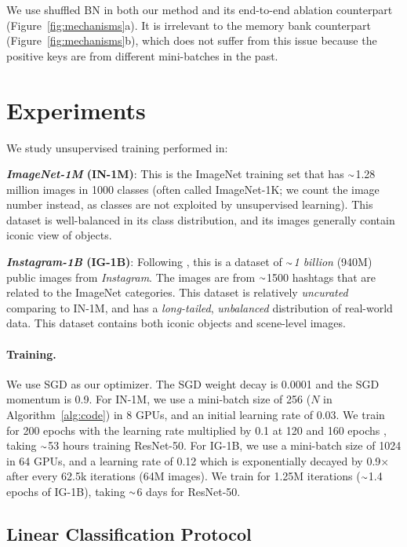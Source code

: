 \documentclass[10pt,twocolumn,letterpaper]{article}
\newcommand{\app}{\raise.17ex\hbox{$\scriptstyle\sim$}}
\begin{document}
We use shuffled BN in both our method and its end-to-end ablation counterpart (Figure~\ref{fig:mechanisms}a). It is irrelevant to the memory bank counterpart (Figure~\ref{fig:mechanisms}b), which does not suffer from this issue because the positive keys are from different mini-batches in the past.

\section{Experiments}
\label{sec:exp}

We study unsupervised training performed in:

\textbf{\emph{ImageNet-1M} (IN-1M)}: This is the ImageNet \cite{Deng2009} training set that has $\app$1.28 million images in 1000 classes (often called ImageNet-1K; we count the image number instead, as classes are not exploited by unsupervised learning).
This dataset is well-balanced in its class distribution, and its images generally contain iconic view of objects.

\textbf{\emph{Instagram-1B} (IG-1B)}: Following \cite{Mahajan2018}, this is a dataset of $\app$\emph{1 billion} (940M) public images from \mbox{\emph{Instagram}}. The images are from $\app$1500 hashtags \cite{Mahajan2018} that are related to the ImageNet categories. This dataset is relatively \emph{uncurated} comparing to IN-1M, and has a \emph{long-tailed}, \emph{\mbox{unbalanced}} distribution of real-world data. This dataset contains both iconic objects and scene-level images.

\paragraph{Training.} We use SGD as our optimizer. 
The SGD weight decay is 0.0001 and the SGD momentum is 0.9.
For \mbox{IN-1M}, we use a mini-batch size of 256 ($N$ in Algorithm~\ref{alg:code}) in 8 GPUs, and an initial learning rate of 0.03. We train for 200 epochs with the learning rate multiplied by 0.1 at 120 and 160 epochs \cite{Wu2018a}, taking $\app$53 hours training ResNet-50.
For IG-1B, we use a mini-batch size of 1024 in 64 GPUs, and a learning rate of 0.12 which is exponentially decayed by 0.9$\times$ after every 62.5k iterations (64M images). We train for 1.25M iterations ($\app$1.4 epochs of IG-1B), taking $\app$6 days for ResNet-50.

\subsection{Linear Classification Protocol}
\label{sec:imagenet}
\end{document}
